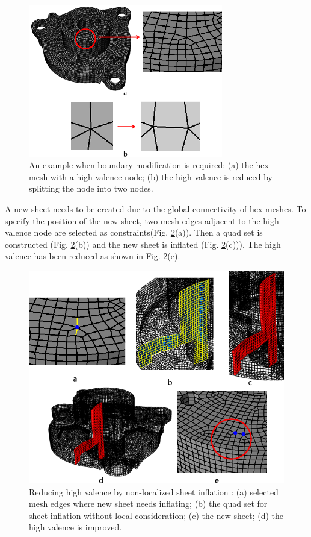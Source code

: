 \documentclass[final,5p,times,twocolumn]{elsarticle}
\begin{document}
\begin{figure}[htbp]
\begin{center}
\includegraphics[width=8.5cm]{rev_figures/intro_high_val.png}
\caption{An example when boundary modification is required: (a) the hex mesh with a high-valence node; (b) the high valence is reduced by splitting the node into two nodes.}
\label{fig:intro_high_val}
\end{center}
\end{figure}

A new sheet needs to be created due to the global connectivity of hex meshes. To specify the position of the new sheet, two mesh edges adjacent to the high-valence node are selected as constraints(Fig. \ref{fig:intro_high_val_whole}(a)). Then a quad set is constructed (Fig. \ref{fig:intro_high_val_whole}(b)) and the new sheet is inflated (Fig. \ref{fig:intro_high_val_whole}(c))). The high valence has been reduced as shown in Fig. \ref{fig:intro_high_val_whole}(e).

\begin{figure}[htbp]
\begin{center}
\includegraphics[width=12cm]{rev_figures/intro_high_val_whole.png}
\caption{Reducing high valence by non-localized sheet inflation : (a) selected mesh edges where new sheet needs inflating; (b) the quad set for sheet inflation without local consideration; (c) the new sheet; (d) the high valence is improved.}
\label{fig:intro_high_val_whole}
\end{center}
\end{figure}
\end{document}
